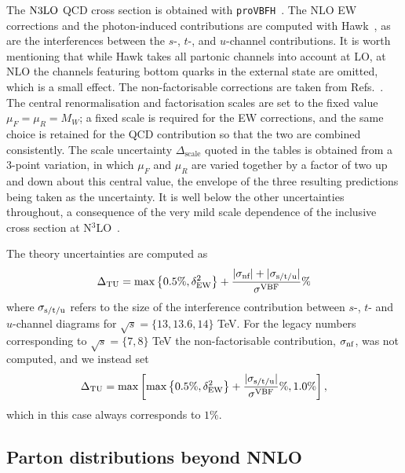 The $\mathrm{N3LO}$ QCD cross section is obtained with
\texttt{proVBFH}~\cite{Cacciari:2015jma,Dreyer:2016oyx}. The NLO EW
corrections and the photon-induced contributions are computed with
{\sc Hawk}~\cite{Denner:2014cla}, as are the interferences between the $s$-,
$t$-, and $u$-channel contributions. It is worth mentioning that while
{\sc Hawk} takes all partonic channels into account at LO, at NLO the channels
featuring bottom quarks in the external state are omitted, which is a small
effect. The non-factorisable corrections are taken from
Refs.~\cite{Liu:2019tuy,Asteriadis:2023nyl}. The central renormalisation and
factorisation scales are set to the fixed value $\mu_F=\mu_R=M_W$; a fixed
scale is required for the EW corrections, and the same choice is retained for
the QCD contribution so that the two are combined consistently. The scale
uncertainty $\Delta_\mathrm{scale}$ quoted in the tables is obtained from a
3-point variation, in which $\mu_F$ and $\mu_R$ are varied together by a factor
of two up and down about this central value, the envelope of the three
resulting predictions being taken as the uncertainty. It is well below the
other uncertainties throughout, a consequence of the very mild scale dependence
of the inclusive cross section at N$^3$LO~\cite{Dreyer:2016oyx}.

The theory uncertainties are computed as
\begin{align}
  \label{eq:vbf-TU}
  \Delta_{\mathrm{TU}} = \max\left\{0.5\%,\delta_{\mathrm{EW}}^2\right\} + \frac{|\sigma_{\mbox{\scriptsize nf}}| + |\sigma_{\mbox{\scriptsize s/t/u}}|}{\sigma^{\mathrm{VBF}}}\%
\end{align}
%
where $\sigma_{\mbox{\scriptsize s/t/u}}$ refers to the size of the
interference contribution between $s$-, $t$- and $u$-channel diagrams for
$\sqrt{s}=\{13,13.6,14\}$ TeV. For the legacy numbers corresponding to
$\sqrt{s}=\{7,8\}$ TeV the non-factorisable contribution,
$\sigma_{\mbox{\scriptsize nf}}$, was not computed, and we instead set
\begin{align}
  \label{eq:vbf-TU-legacy}
  \Delta_{\mathrm{TU}} = \max\left[\max\left\{0.5\%,\delta_{\mathrm{EW}}^2\right\} + \frac{|\sigma_{\mbox{\scriptsize s/t/u}}|}{\sigma^{\mathrm{VBF}}}\%,1.0\%\right],
\end{align}
which in this case always corresponds to $1\%$.

\subsection{Parton distributions beyond NNLO}
\label{sec:vbf_an3lo}

